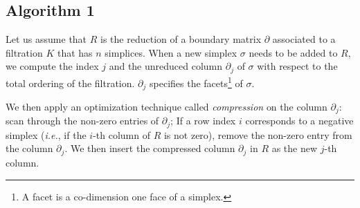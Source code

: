 \documentclass[11pt]{article}
\begin{document}
\subsection{Algorithm 1}

Let us assume that $R$ is the reduction of a boundary matrix $\partial$ associated to a filtration 
$K$ that has $n$ simplices.  When a new simplex $\sigma$ needs to be added to $R$, we compute the 
index $j$ and the unreduced column $\partial_j$ of $\sigma$ with respect to the total ordering of 
the filtration.  $\partial_j$ specifies the facets\footnote{A facet is a co-dimension one face of a 
simplex.} of $\sigma$.

We then apply an optimization technique called \emph{compression} \cite{kerber-18} on the column 
$\partial_j$: scan through the non-zero entries of $\partial_j$; If a row index $i$ corresponds to 
a negative simplex (\emph{i.e.}, if the $i$-th column of $R$ is not zero), remove the non-zero entry
from the column $\partial_j$.  We then insert the compressed column $\partial_j$ in $R$ as the new 
$j$-th column.




\end{document}
